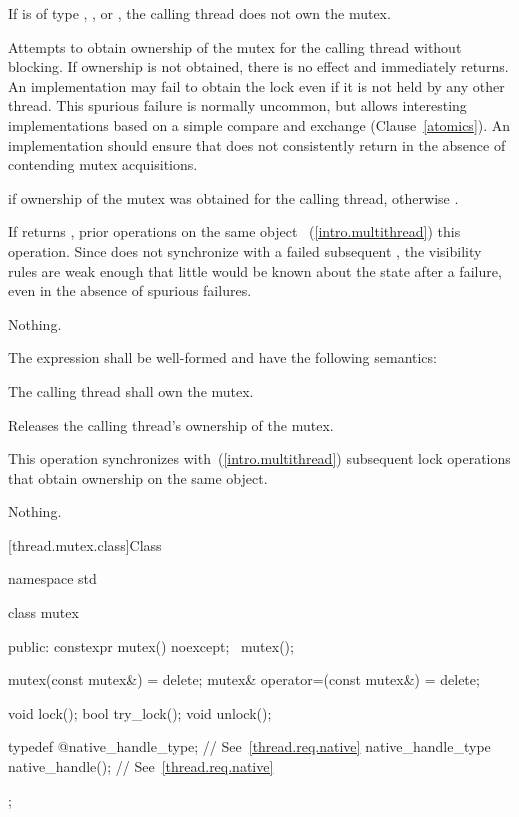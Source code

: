 \begin{itemdescr}
\pnum
\requires If  is of type , ,
or , the calling
thread does not own the mutex.

\pnum
\effects Attempts to obtain ownership of the mutex for the calling thread without
blocking. If ownership is not obtained, there is no effect and 
immediately returns. An implementation may fail to obtain the lock even if it is not
held by any other thread. \enternote This spurious failure is normally uncommon, but
allows interesting implementations based on a simple
compare and exchange
(Clause~\ref{atomics}). \exitnote
An implementation should ensure that  does not consistently return 
in the absence of contending mutex acquisitions.

\pnum
\returntype {}

\pnum
\returns {} if ownership of the mutex was obtained for the calling
thread, otherwise .

\pnum
\sync If  returns , prior  operations
on the same object ~(\ref{intro.multithread}) this operation.
\enternote Since  does not synchronize with a failed subsequent
, the visibility rules are weak enough that little would be
known about the state after a failure, even in the absence of spurious failures. \exitnote

\pnum
\throws Nothing.
\end{itemdescr}

\pnum
The expression  shall be well-formed and have the following semantics:

\begin{itemdescr}
\pnum
\precondition The calling thread shall own the mutex.

\pnum
\effects Releases the calling thread's ownership of the mutex.

\pnum
\returntype {}

\pnum
\sync This operation synchronizes with~(\ref{intro.multithread}) subsequent
lock operations that obtain ownership on the same object.

\pnum
\throws Nothing.
\end{itemdescr}

[thread.mutex.class]{Class }

\begin{codeblock}
namespace std {
  class mutex {
  public:
    constexpr mutex() noexcept;
    ~mutex();

    mutex(const mutex&) = delete;
    mutex& operator=(const mutex&) = delete;

    void lock();
    bool try_lock();
    void unlock();

    typedef @\impdef@ native_handle_type; // See~\ref{thread.req.native}
    native_handle_type native_handle();                // See~\ref{thread.req.native}
  };
}
\end{codeblock}

